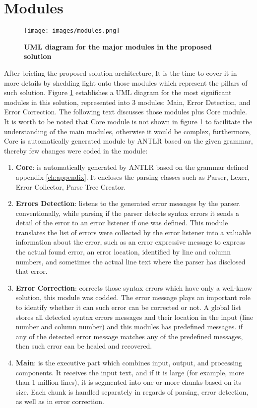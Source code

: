\section {Modules} 

	\begin{figure}[ht]
	\begin{center}
		\texttt{[image: images/modules.png]}
				\setlength\belowcaptionskip{-7mm}
		\caption{\textbf{UML diagram for the major modules in the proposed solution}}
		\label{Fig:UML}
	\end{center}
\end{figure}

After briefing the proposed solution architecture, It is the time to cover it in more details by shedding light onto those modules which represent the pillars of such solution. {Figure \ref{Fig:UML}} establishes a UML diagram for the most significant modules in this solution, represented into 3 modules: Main, Error Detection, and Error Correction. The following text discusses those modules plus Core module. It is worth to be noted that Core module is not shown in {figure \ref{Fig:UML}} to facilitate the understanding of the main modules, otherwise it would be complex, furthermore, Core is automatically generated module by ANTLR based on the given grammar, thereby few changes were coded in the module:  
 \begin{enumerate}[]
 \item \textbf {Core}: is automatically generated by ANTLR based on the grammar defined appendix \ref{ch:appendix}. It encloses the parsing classes such as Parser, Lexer, Error Collector, Parse Tree Creator.   
\item \textbf{Errors Detection}: listens to the generated error messages by the parser. conventionally, while parsing if the parser detects syntax errors it sends a detail of the error to an error listener if one was defined. This module translates the list of errors were collected by the error listener into a valuable information about the error, such as an error expressive message to express the actual found error, an error location, identified by line and column numbers, and sometimes the actual line text where the parser has disclosed that error.
\item \textbf {Error Correction}: corrects those syntax errors which have only a well-know solution, this module was codded. The error message plays an important role to identify whether it can such error can be corrected or not. A global list stores all detected syntax errors messages and their location in the input (line number and column number) and this modules has predefined messages. if any of the detected error message matches any of the predefined messages, then such error can be healed and recovered.
\item \textbf{Main}: is the executive part which combines input, output, and processing components. It receives the input text, and if it is large (for example, more than 1 million lines), it is segmented into one or more chunks based on its size. Each chunk is handled separately in regards of parsing, error detection, as well as in error correction.

\end{enumerate} 

